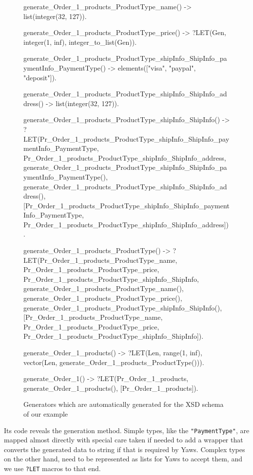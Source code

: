 \documentclass[copyright]{eptcs}
\newcommand{\LET}{\texttt{?LET}\xspace}
\begin{document}
\begin{figure}
\begin{lsterlang}[xleftmargin=2em,numbers=left,numbersep=5pt]
generate_Order_1_products_ProductType_name() -> 
  list(integer(32, 127)).

generate_Order_1_products_ProductType_price() ->  
  ?LET(Gen, integer(1, inf), integer_to_list(Gen)).

generate_Order_1_products_ProductType_shipInfo_ShipInfo_paymentInfo_PaymentType() -> 
  elements(["visa", "paypal", "deposit"]).

generate_Order_1_products_ProductType_shipInfo_ShipInfo_address() -> 
  list(integer(32, 127)).

generate_Order_1_products_ProductType_shipInfo_ShipInfo() -> 
  ?LET({Pr_Order_1_products_ProductType_shipInfo_ShipInfo_paymentInfo_PaymentType,
         Pr_Order_1_products_ProductType_shipInfo_ShipInfo_address},
        {generate_Order_1_products_ProductType_shipInfo_ShipInfo_paymentInfo_PaymentType(),
         generate_Order_1_products_ProductType_shipInfo_ShipInfo_address()},
        [Pr_Order_1_products_ProductType_shipInfo_ShipInfo_paymentInfo_PaymentType,
         Pr_Order_1_products_ProductType_shipInfo_ShipInfo_address]).

generate_Order_1_products_ProductType() -> 
  ?LET({Pr_Order_1_products_ProductType_name, 
         Pr_Order_1_products_ProductType_price, 
         Pr_Order_1_products_ProductType_shipInfo_ShipInfo},
        {generate_Order_1_products_ProductType_name(), 
         generate_Order_1_products_ProductType_price(), 
         generate_Order_1_products_ProductType_shipInfo_ShipInfo()},
        [Pr_Order_1_products_ProductType_name, 
         Pr_Order_1_products_ProductType_price, 
         Pr_Order_1_products_ProductType_shipInfo_ShipInfo]).

generate_Order_1_products() -> 
  ?LET(Len, range(1, inf), vector(Len, generate_Order_1_products_ProductType())).

generate_Order_1() -> 
  ?LET(Pr_Order_1_products, generate_Order_1_products(), [Pr_Order_1_products]).
\end{lsterlang}
\caption{Generators which are automatically generated for the XSD
  schema of our example}
\label{fig:generators}
\end{figure}

Its code reveals the generation method. Simple types, like the
\texttt{"PaymentType"}, are mapped almost directly with special care
taken if needed to add a wrapper that converts the generated data to
string if that is required by Yaws. Complex types on the other hand,
need to be represented as lists for Yaws to accept them, and we use
\LET macros to that end.
\end{document}
